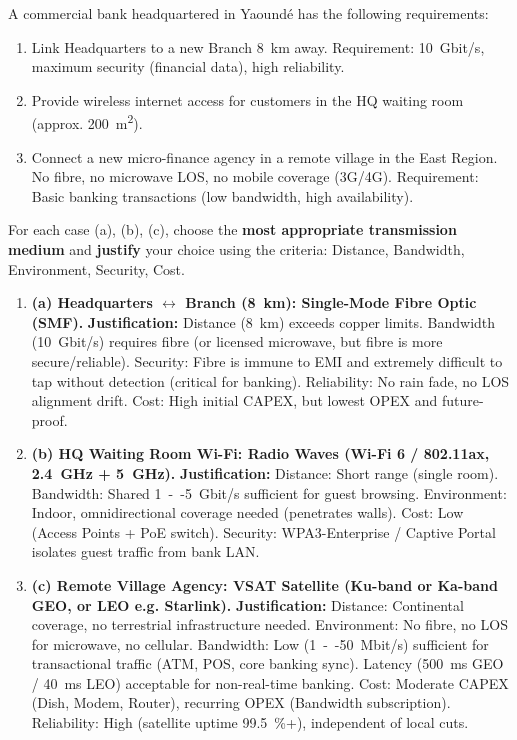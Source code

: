 \documentclass[11pt]{article}
\begin{document}
\begin{exercice}
A commercial bank headquartered in Yaoundé has the following requirements:
\begin{enumerate}
\item Link Headquarters to a new Branch \SI{8}{km} away. Requirement: \SI{10}{Gbit/s}, maximum security (financial data), high reliability.
\item Provide wireless internet access for customers in the HQ waiting room (approx. \SI{200}{m^2}).
\item Connect a new micro-finance agency in a remote village in the East Region. No fibre, no microwave LOS, no mobile coverage (3G/4G). Requirement: Basic banking transactions (low bandwidth, high availability).
\end{enumerate}
For each case (a), (b), (c), choose the \textbf{most appropriate transmission medium} and \textbf{justify} your choice using the criteria: Distance, Bandwidth, Environment, Security, Cost.
\end{exercice}

\begin{corrige}[Exercise 1]
\begin{enumerate}
\item \textbf{(a) Headquarters $\leftrightarrow$ Branch (\SI{8}{km}): Single-Mode Fibre Optic (SMF).}
\textbf{Justification:} Distance (\SI{8}{km}) exceeds copper limits. Bandwidth (\SI{10}{Gbit/s}) requires fibre (or licensed microwave, but fibre is more secure/reliable). Security: Fibre is immune to EMI and extremely difficult to tap without detection (critical for banking). Reliability: No rain fade, no LOS alignment drift. Cost: High initial CAPEX, but lowest OPEX and future-proof.
\item \textbf{(b) HQ Waiting Room Wi-Fi: Radio Waves (Wi-Fi 6 / 802.11ax, \SI{2.4}{GHz} + \SI{5}{GHz}).}
\textbf{Justification:} Distance: Short range (single room). Bandwidth: Shared \SI{1}{--}\SI{5}{Gbit/s} sufficient for guest browsing. Environment: Indoor, omnidirectional coverage needed (penetrates walls). Cost: Low (Access Points + PoE switch). Security: WPA3-Enterprise / Captive Portal isolates guest traffic from bank LAN.
\item \textbf{(c) Remote Village Agency: VSAT Satellite (Ku-band or Ka-band GEO, or LEO e.g. Starlink).}
\textbf{Justification:} Distance: Continental coverage, no terrestrial infrastructure needed. Environment: No fibre, no LOS for microwave, no cellular. Bandwidth: Low (\SI{1}{--}\SI{50}{Mbit/s}) sufficient for transactional traffic (ATM, POS, core banking sync). Latency (\SI{500}{ms} GEO / \SI{40}{ms} LEO) acceptable for non-real-time banking. Cost: Moderate CAPEX (Dish, Modem, Router), recurring OPEX (Bandwidth subscription). Reliability: High (satellite uptime \SI{99.5}{\%}+), independent of local cuts.
\end{enumerate}
\end{corrige}
\end{document}
